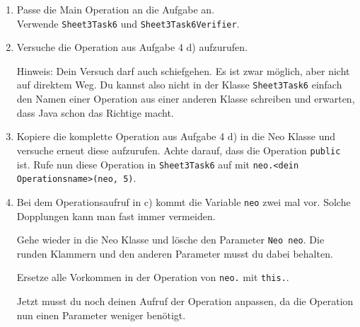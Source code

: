 

\begin{enumerate}
	\item 
		Passe die Main Operation an die Aufgabe an.\\
		Verwende \lstinline{Sheet3Task6} und \lstinline{Sheet3Task6Verifier}.
		
	\item 
		Versuche die Operation aus Aufgabe 4 d) aufzurufen.

		Hinweis: Dein Versuch darf auch schiefgehen.
		Es ist zwar möglich, aber nicht auf direktem Weg.
		Du kannst also nicht in der Klasse \lstinline{Sheet3Task6} einfach den Namen einer Operation aus einer anderen Klasse schreiben und erwarten, dass Java schon das Richtige macht.
		
	\item 
		Kopiere die komplette Operation aus Aufgabe 4 d) in die Neo Klasse und versuche erneut diese aufzurufen. 
		Achte darauf, dass die Operation \lstinline{public} ist.
		Rufe nun diese Operation in \lstinline{Sheet3Task6} auf mit \lstinline{neo.<dein Operationsname>(neo, 5)}.
	
	\item
		Bei dem Operationsaufruf in c) kommt die Variable \lstinline{neo} zwei mal vor.
		Solche Dopplungen kann man fast immer vermeiden.
		
		Gehe wieder in die Neo Klasse und lösche den Parameter \lstinline{Neo neo}.
		Die runden Klammern und den anderen Parameter musst du dabei behalten.

		Ersetze alle Vorkommen in der Operation von \lstinline{neo.} mit \lstinline{this.}.

		Jetzt musst du noch deinen Aufruf der Operation anpassen, da die Operation nun einen Parameter weniger benötigt.
\end{enumerate}


